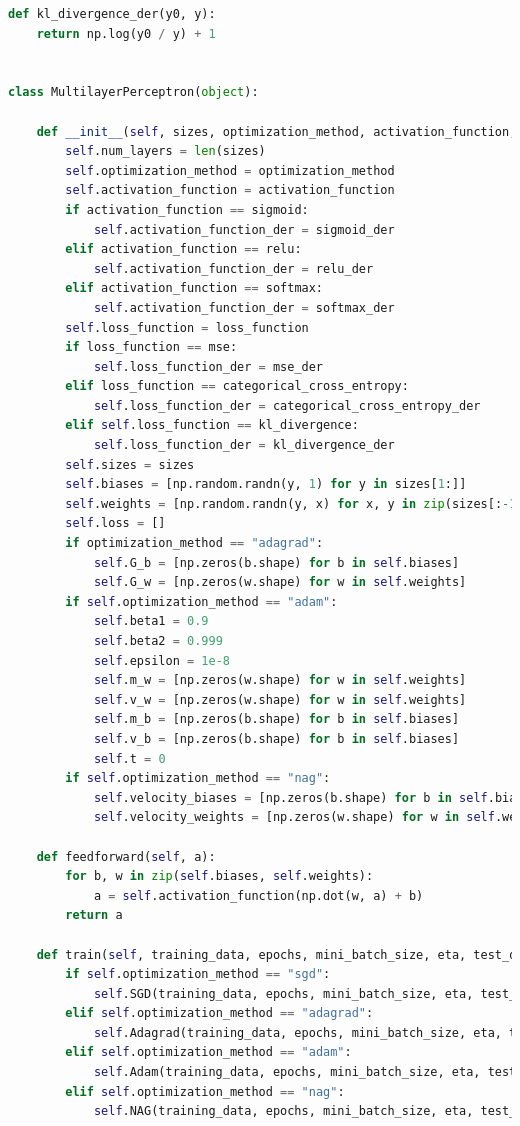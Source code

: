 \documentclass[a4paper, 14pt]{extarticle}
\begin{document}
\begin{lstlisting}[language={python},caption={Методы оптимизации на примере многослойного персептрона, генетический алгоритм},label={lst:code1}]
def kl_divergence_der(y0, y):
    return np.log(y0 / y) + 1


class MultilayerPerceptron(object):

    def __init__(self, sizes, optimization_method, activation_function, loss_function):
        self.num_layers = len(sizes)
        self.optimization_method = optimization_method
        self.activation_function = activation_function
        if activation_function == sigmoid:
            self.activation_function_der = sigmoid_der
        elif activation_function == relu:
            self.activation_function_der = relu_der
        elif activation_function == softmax:
            self.activation_function_der = softmax_der
        self.loss_function = loss_function
        if loss_function == mse:
            self.loss_function_der = mse_der
        elif loss_function == categorical_cross_entropy:
            self.loss_function_der = categorical_cross_entropy_der
        elif self.loss_function == kl_divergence:
            self.loss_function_der = kl_divergence_der
        self.sizes = sizes
        self.biases = [np.random.randn(y, 1) for y in sizes[1:]]
        self.weights = [np.random.randn(y, x) for x, y in zip(sizes[:-1], sizes[1:])]
        self.loss = []
        if optimization_method == "adagrad":
            self.G_b = [np.zeros(b.shape) for b in self.biases]
            self.G_w = [np.zeros(w.shape) for w in self.weights]
        if self.optimization_method == "adam":
            self.beta1 = 0.9
            self.beta2 = 0.999
            self.epsilon = 1e-8
            self.m_w = [np.zeros(w.shape) for w in self.weights]
            self.v_w = [np.zeros(w.shape) for w in self.weights]
            self.m_b = [np.zeros(b.shape) for b in self.biases]
            self.v_b = [np.zeros(b.shape) for b in self.biases]
            self.t = 0
        if self.optimization_method == "nag":
            self.velocity_biases = [np.zeros(b.shape) for b in self.biases]
            self.velocity_weights = [np.zeros(w.shape) for w in self.weights]

    def feedforward(self, a):
        for b, w in zip(self.biases, self.weights):
            a = self.activation_function(np.dot(w, a) + b)
        return a

    def train(self, training_data, epochs, mini_batch_size, eta, test_data):
        if self.optimization_method == "sgd":
            self.SGD(training_data, epochs, mini_batch_size, eta, test_data)
        elif self.optimization_method == "adagrad":
            self.Adagrad(training_data, epochs, mini_batch_size, eta, test_data)
        elif self.optimization_method == "adam":
            self.Adam(training_data, epochs, mini_batch_size, eta, test_data)
        elif self.optimization_method == "nag":
            self.NAG(training_data, epochs, mini_batch_size, eta, test_data)


\end{lstlisting}
\end{document}
